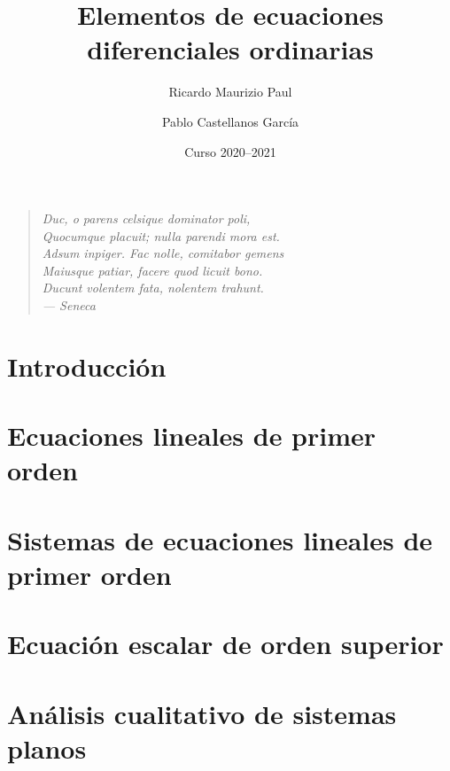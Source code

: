 \documentclass[a4paper, 10pt]{book}
\title{Elementos de ecuaciones diferenciales ordinarias}
\author{Ricardo Maurizio Paul \and Pablo Castellanos García}
\date{Curso 2020--2021}
\begin{document}
\frontmatter

\maketitle

\cleardoublepage
\vspace*{\fill}
\thispagestyle{empty} %
\begin{quotation}
\raggedleft
\em %
Duc, o parens celsique dominator poli, \\
Quocumque placuit; nulla parendi mora est. \\
Adsum inpiger. Fac nolle, comitabor gemens \\
Maiusque patiar, facere quod licuit bono. \\
Ducunt volentem fata, nolentem trahunt. \\
\bigskip
--- Seneca
\end{quotation}
\vspace*{\fill}

\tableofcontents

\chapter{Introducción}


\mainmatter

\chapter{Ecuaciones lineales de primer orden}
\label{chap:capitulo1}


\chapter{Sistemas de ecuaciones lineales de primer orden}
\label{chap:capitulo2}



\chapter{Ecuación escalar de orden superior}
\label{chap:capitulo3}


\chapter{Análisis cualitativo de sistemas planos}
\label{chap:capitulo4}

\end{document}
